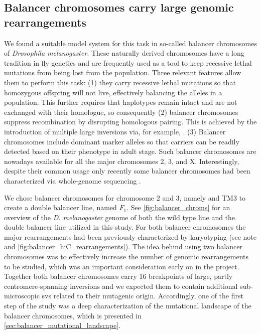 \subsection{Balancer chromosomes carry large genomic rearrangements}
\label{sec:balancer_balancers}

We found a suitable model system for this task in so-called balancer chromosomes
of \textit{Drosophila melanogaster}. These naturally derived chromosomes have a
long tradition in fly genetics and are frequently used as a tool to keep
recessive lethal mutations from being lost from the population. Three relevant
features allow them to perform this task: (1) they carry recessive lethal
mutations so that homozygous offspring will not live, effectively balancing the
alleles in a population. This further requires that haplotypes remain intact and
are not exchanged with their homologue, so consequently (2) balancer chromosomes
suppress recombination by disrupting homologous pairing. This is achieved by the
introduction of multiple large inversions via, for example,
.
(3) Balancer chromosomes include dominant marker alleles so that carriers can be
readily detected based on their phenotype in adult stage. Such balancer
chromosomes are nowadays available for all the major chromosomes 2, 3, and X.
Interestingly, despite their common usage only recently some balancer
chromosomes had been characterized via whole-genome sequencing \citep{Miller2016}.

We chose balancer chromosomes for chromosome 2 and 3, namely 
and TM3 \citep{Tinderholt1960} to create a double balancer line, named $F_1$.
See \cref{fig:balancer_chroms} for an overview of the \textit{D. melanogaster}
genome of both the wild type line and the double balancer line utilized in this
study. For both balancer chromosomes the major rearrangements had been
previously characterized by karyotyping (see
note and
\cref{fig:balancer_hiC_rearrangements}). The idea behind using two balancer
chromosomes was to effectively increase the number of genomic rearrangements to
be studied, which was an important consideration early on in the project.
Together both balancer chromosomes carry 16 breakpoints of large, partly
centromere-spanning inversions and we expected them to contain additional
sub-microscopic \acp{sv} related to their mutagenic origin. Accordingly, one of
the first step of the study was a deep characterization of the mutational
landscape  of the balancer chromosomes, which is presented in
\cref{sec:balancer_mutational_landscape}.





